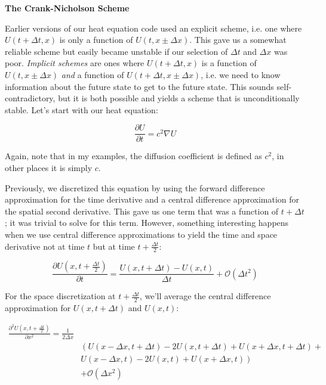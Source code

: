 \documentclass[12pt, letterpaper]{article}
\begin{document}
\noindent
{\LARGE \textbf{The Crank-Nicholson Scheme}}

Earlier versions of our heat equation code used an explicit scheme, i.e. one
where  $U(t+\Delta t, x)$ is only a function of $U(t, x\pm\Delta x)$.  This
gave us a somewhat reliable scheme but easily became unstable if our selection
of $\Delta t$ and $\Delta x$ was poor.  \emph{Implicit schemes} are ones where
$U(t+\Delta t, x)$ is a function of $U(t, x\pm\Delta x)$ \emph{and} a function
of $U(t+\Delta t, x\pm\Delta x)$, i.e. we need to know information about the
future state to get to the future state.  This sounds self-contradictory, but
it is both possible and yields a scheme that is unconditionally stable.
Let's start with our heat equation:

\begin{equation}
  \label{heat}
  \frac{\partial U}{\partial t} = c^{2} \nabla U
\end{equation}

\noindent
Again, note that in my examples, the diffusion coefficient is defined as
$c^{2}$, in other places it is simply $c$.

Previously, we discretized this equation by using the forward difference
approximation for the time derivative and a central difference approximation
for the spatial second derivative. This gave us one term that was a function
of $t+\Delta t$; it was trivial to solve for this term.  However, something
interesting happens when we use central difference approximations to yield
the time and space derivative not at time $t$ but at time 
$t+\frac{\Delta t}{2}$:

\begin{equation}
  \label{disct}
  \frac{\partial U(x,t+\frac{\Delta t}{2})}{\partial t} = 
  \frac{U(x, t+\Delta t) - U(x, t)}{\Delta t} + \mathcal{O}(\Delta t^{2})
\end{equation}

\noindent
For the space discretization at $t+\frac{\Delta t}{2}$, we'll average the
central difference approximation for $U(x,t+\Delta t)$ and 
$U(x,t)$:

\begin{align}
  \label{discx}
  \frac{\partial^{2} U(x,t+\frac{\Delta t}{2})}{\partial x^{2}} = 
  \frac{1}{2\Delta x}\\
  \nonumber & \left(U(x-\Delta x,t+\Delta t) - 
  2U(x,t+\Delta t) + U(x+\Delta x,t+\Delta t) + \right.\\
  \nonumber & \left. U(x-\Delta x,t) - 
  2U(x,t) + U(x+\Delta x,t)\right) \\
  \nonumber & + \mathcal{O}(\Delta x^{2})
\end{align}
\end{document}

